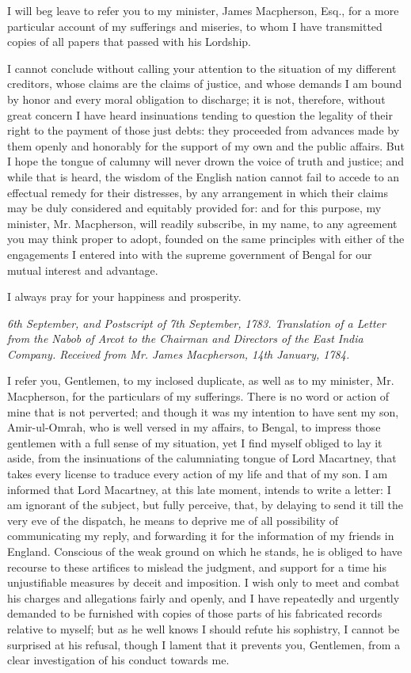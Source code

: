 I will beg leave to refer you to my minister, James Macpherson, Esq., for a more particular account of my sufferings and miseries, to whom I have transmitted copies of all papers that passed with his Lordship.

I cannot conclude without calling your attention to the situation of my different creditors, whose claims are the claims of justice, and whose demands I am bound by honor and every moral obligation to discharge; it is not, therefore, without great concern I have heard insinuations tending to question the legality of their right to the payment of those just debts: they proceeded from advances made by them openly and honorably for the support of my own and the public affairs. But I hope the tongue of calumny will never drown the voice of truth and justice; and while that is heard, the wisdom of the English nation cannot fail to accede to an effectual remedy for their distresses, by any arrangement in which their claims may be duly considered and equitably provided for: and for this purpose, my minister, Mr. Macpherson, will readily subscribe, in my name, to any agreement you may think proper to adopt, founded on the same principles with either of the engagements I entered into with the supreme government of Bengal for our mutual interest and advantage.

I always pray for your happiness and prosperity.

\PRLsep

\textit{6th September, and Postscript of 7th September, 1783. Translation of a Letter from the Nabob of Arcot to the Chairman and Directors of the East India Company. Received from Mr. James Macpherson, 14th January, 1784.}
\vspace{0.3cm}

I refer you, Gentlemen, to my inclosed duplicate, as well as to my minister, Mr. Macpherson, for the particulars of my sufferings. There is no word or action of mine that is not perverted; and though it was my intention to have sent my son, Amir-ul-Omrah, who is well versed in my affairs, to Bengal, to impress those gentlemen with a full sense of my situation, yet I find myself obliged to lay it aside, from the insinuations of the calumniating tongue of Lord Macartney, that takes every license to traduce every action of my life and that of my son. I am informed that Lord Macartney, at this late moment, intends to write a letter: I am ignorant of the subject, but fully perceive, that, by delaying to send it till the very eve of the dispatch, he means to deprive me of all possibility of communicating my reply, and forwarding it for the information of my friends in England. Conscious of the weak ground on which he stands, he is obliged to have recourse to these artifices to mislead the judgment, and support for a time his unjustifiable measures by deceit and imposition. I wish only to meet and combat his charges and allegations fairly and openly, and I have repeatedly and urgently demanded to be furnished with copies of those parts of his fabricated records relative to myself; but as he well knows I should refute his sophistry, I cannot be surprised at his refusal, though I lament that it prevents you, Gentlemen, from a clear investigation of his conduct towards me.

